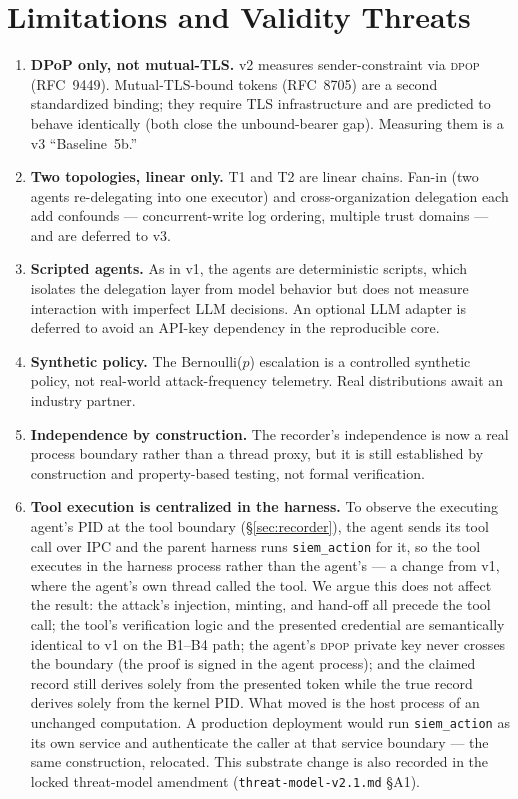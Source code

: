 \documentclass[11pt]{article}
\newcommand{\code}[1]{\texttt{#1}}
\newcommand{\siem}{\code{siem\_action}}
\newcommand{\dpop}{\textsc{dpop}}
\begin{document}
\section{Limitations and Validity Threats}
\label{sec:validity}

\begin{enumerate}[leftmargin=1.6em,itemsep=3pt]
  \item \textbf{DPoP only, not mutual-TLS.} v2 measures sender-constraint via
  \dpop{} (RFC~9449). Mutual-TLS-bound tokens (RFC~8705) are a second
  standardized binding; they require TLS infrastructure and are predicted to
  behave identically (both close the unbound-bearer gap). Measuring them is a
  v3 ``Baseline~5b.''
  \item \textbf{Two topologies, linear only.} T1 and T2 are linear chains.
  Fan-in (two agents re-delegating into one executor) and cross-organization
  delegation each add confounds --- concurrent-write log ordering, multiple
  trust domains --- and are deferred to v3.
  \item \textbf{Scripted agents.} As in v1, the agents are deterministic
  scripts, which isolates the delegation layer from model behavior but does
  not measure interaction with imperfect LLM decisions. An optional LLM
  adapter is deferred to avoid an API-key dependency in the reproducible core.
  \item \textbf{Synthetic policy.} The Bernoulli($p$) escalation is a
  controlled synthetic policy, not real-world attack-frequency telemetry.
  Real distributions await an industry partner.
  \item \textbf{Independence by construction.} The recorder's independence is
  now a real process boundary rather than a thread proxy, but it is still
  established by construction and property-based testing, not formal
  verification.
  \item \textbf{Tool execution is centralized in the harness.} To observe the
  executing agent's PID at the tool boundary (\S\ref{sec:recorder}), the agent
  sends its tool call over IPC and the parent harness runs \siem{} for it, so
  the tool executes in the harness process rather than the agent's --- a change
  from v1, where the agent's own thread called the tool. We argue this does not
  affect the result: the attack's injection, minting, and hand-off all precede
  the tool call; the tool's verification logic and the presented credential are
  semantically identical to v1 on the B1--B4 path; the agent's \dpop{} private key never crosses the
  boundary (the proof is signed in the agent process); and the claimed record
  still derives solely from the presented token while the true record derives
  solely from the kernel PID. What moved is the host process of an unchanged
  computation. A production deployment would run \siem{} as its own service and
  authenticate the caller at that service boundary --- the same construction,
  relocated. This substrate change is also recorded in the locked threat-model
  amendment (\code{threat-model-v2.1.md} §A1).
\end{enumerate}
\end{document}
